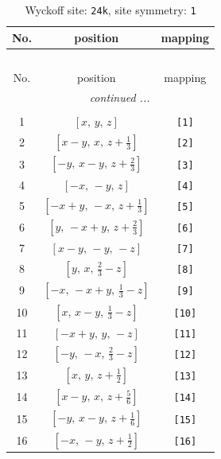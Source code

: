 \documentclass[fleqn,8pt]{jsarticle}
\begin{document}
\begin{longtable}{ccc}
\caption{Wyckoff site: {\tt 24k}, site symmetry: {\tt 1}}
 \\
 \hline \hline
No. & position & mapping \\ \hline \endfirsthead

\multicolumn{2}{l}{\tablename\ \thetable{}} \\
 \hline \hline
No. & position & mapping \\ \hline \endhead

 \hline \hline
\multicolumn{2}{r}{\footnotesize\it continued ...} \\ \endfoot

 \hline \hline
\multicolumn{2}{r}{} \\ \endlastfoot

1 & $\left[ x,\, y,\, z \right]$ & {\tt [1]} \\ \hline
2 & $\left[ x - y,\, x,\, z + \frac{1}{3} \right]$ & {\tt [2]} \\ \hline
3 & $\left[ - y,\, x - y,\, z + \frac{2}{3} \right]$ & {\tt [3]} \\ \hline
4 & $\left[ - x,\, - y,\, z \right]$ & {\tt [4]} \\ \hline
5 & $\left[ - x + y,\, - x,\, z + \frac{1}{3} \right]$ & {\tt [5]} \\ \hline
6 & $\left[ y,\, - x + y,\, z + \frac{2}{3} \right]$ & {\tt [6]} \\ \hline
7 & $\left[ x - y,\, - y,\, - z \right]$ & {\tt [7]} \\ \hline
8 & $\left[ y,\, x,\, \frac{2}{3} - z \right]$ & {\tt [8]} \\ \hline
9 & $\left[ - x,\, - x + y,\, \frac{1}{3} - z \right]$ & {\tt [9]} \\ \hline
10 & $\left[ x,\, x - y,\, \frac{1}{3} - z \right]$ & {\tt [10]} \\ \hline
11 & $\left[ - x + y,\, y,\, - z \right]$ & {\tt [11]} \\ \hline
12 & $\left[ - y,\, - x,\, \frac{2}{3} - z \right]$ & {\tt [12]} \\ \hline
13 & $\left[ x,\, y,\, z + \frac{1}{2} \right]$ & {\tt [13]} \\ \hline
14 & $\left[ x - y,\, x,\, z + \frac{5}{6} \right]$ & {\tt [14]} \\ \hline
15 & $\left[ - y,\, x - y,\, z + \frac{1}{6} \right]$ & {\tt [15]} \\ \hline
16 & $\left[ - x,\, - y,\, z + \frac{1}{2} \right]$ & {\tt [16]} \\ \hline

\end{longtable}
\end{document}
